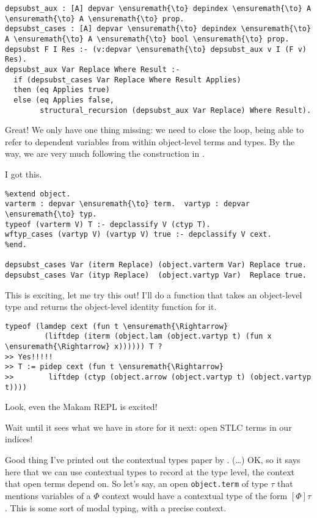 \begin{verbatim}
depsubst_aux : [A] depvar \ensuremath{\to} depindex \ensuremath{\to} A \ensuremath{\to} A \ensuremath{\to} prop.
depsubst_cases : [A] depvar \ensuremath{\to} depindex \ensuremath{\to} A \ensuremath{\to} A \ensuremath{\to} bool \ensuremath{\to} prop.
depsubst F I Res :- (v:depvar \ensuremath{\to} depsubst_aux v I (F v) Res).
depsubst_aux Var Replace Where Result :-
  if (depsubst_cases Var Replace Where Result Applies)
  then (eq Applies true)
  else (eq Applies false,
        structural_recursion (depsubst_aux Var Replace) Where Result).
\end{verbatim}

\heroADVISOR{} Great! We only have one thing missing: we need to close the
loop, being able to refer to dependent variables from within
object-level terms and types. By the way, we are very much following the
construction in \citet{stampoulis2013veriml}.

\heroSTUDENT{} I got this.

\begin{verbatim}
%extend object.
varterm : depvar \ensuremath{\to} term.  vartyp : depvar \ensuremath{\to} typ.
typeof (varterm V) T :- depclassify V (ctyp T).
wftyp_cases (vartyp V) (vartyp V) true :- depclassify V cext.
%end.

depsubst_cases Var (iterm Replace) (object.varterm Var) Replace true.
depsubst_cases Var (ityp Replace)  (object.vartyp Var)  Replace true.
\end{verbatim}

\heroADVISOR{} This is exciting, let me try this out! I'll do a function that
takes an object-level type and returns the object-level identity
function for it.

\begin{verbatim}
typeof (lamdep cext (fun t \ensuremath{\Rightarrow}
         (liftdep (iterm (object.lam (object.vartyp t) (fun x \ensuremath{\Rightarrow} x)))))) T ?
>> Yes!!!!!
>> T := pidep cext (fun t \ensuremath{\Rightarrow}
>>        liftdep (ctyp (object.arrow (object.vartyp t) (object.vartyp t))))
\end{verbatim}

\heroSTUDENT{} Look, even the Makam REPL is excited!

\heroADVISOR{} Wait until it sees what we have in store for it next: open STLC
terms in our indices!

\heroSTUDENT{} Good thing I've printed out the contextual types paper by
\citet{nanevski2008contextual}. (\ldots{}) OK, so it says here that we
can use contextual types to record at the type level, the context that
open terms depend on. So let's say, an open \texttt{object.term} of type
\(\tau\) that mentions variables of a \(\Phi\) context would have a
contextual type of the form \([\Phi] \tau\). This is some sort of modal
typing, with a precise context.

